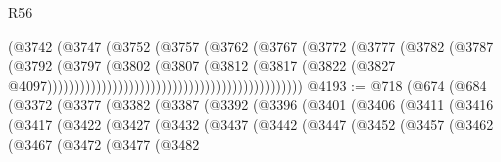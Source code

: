 \begin{lexlean}{R56}
\begin{coremodule}
                                                              (@3742
                                                                (@3747
                                                                  (@3752
                                                                    (@3757
                                                                      (@3762
                                                                        (@3767
                                                                          (@3772
                                                                            (@3777
                                                                              (@3782
                                                                                (@3787
                                                                                  (@3792
                                                                                    (@3797
                                                                                      (@3802
                                                                                        (@3807
                                                                                          (@3812
                                                                                            (@3817
                                                                                              (@3822
                                                                                                (@3827
                                                                                                  @4097)))))))))))))))))))))))))))))))))))))))))))))))
@4193 := @718
    (@674
      (@684
        (@3372
          (@3377
            (@3382
              (@3387
                (@3392
                  (@3396
                    (@3401
                      (@3406
                        (@3411
                          (@3416
                            (@3417
                              (@3422
                                (@3427
                                  (@3432
                                    (@3437
                                      (@3442
                                        (@3447
                                          (@3452
                                            (@3457
                                              (@3462
                                                (@3467
                                                  (@3472
                                                    (@3477
                                                      (@3482

\end{coremodule}
\end{lexlean}
